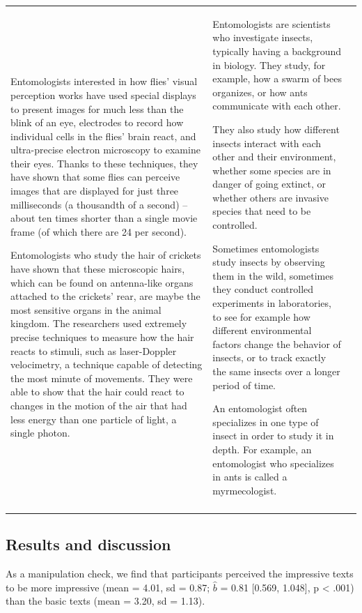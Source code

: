 \documentclass[
  english,
  doc,floatsintext]{apa6}
\begin{document}
\begin{longtable}[t]{>{\raggedright\arraybackslash}p{5em}>{\raggedright\arraybackslash}p{25em}>{\raggedright\arraybackslash}p{25em}}
Entomologists interested in how flies’ visual perception works have used special displays to present images for much less than the blink of an eye, electrodes to record how individual cells in the flies’ brain react, and ultra-precise electron microscopy to examine their eyes. Thanks to these techniques, they have shown that some flies can perceive images that are displayed for just three milliseconds (a thousandth of a second) – about ten times shorter than a single movie frame (of which there are 24 per second). 

Entomologists who study the hair of crickets have shown that these microscopic hairs, which can be found on antenna-like organs attached to the crickets’ rear, are maybe the most sensitive organs in the animal kingdom. The researchers used extremely precise techniques to measure how the hair reacts to stimuli, such as laser-Doppler velocimetry, a technique capable of detecting the most minute of movements. They were able to show that the hair could react to changes in the motion of the air that had less energy than one particle of light, a single photon. & Entomologists are scientists who investigate insects, typically having a background in biology. They study, for example, how a swarm of bees organizes, or how ants communicate with each other. 

They also study how different insects interact with each other and their environment, whether some species are in danger of going extinct, or whether others are invasive species that need to be controlled.

Sometimes entomologists study insects by observing them in the wild, sometimes they conduct controlled experiments in laboratories, to see for example how different environmental factors change the behavior of insects, or to track exactly the same insects over a longer period of time.

An entomologist often specializes in one type of insect in order to study it in depth. For example, an entomologist who specializes in ants is called a myrmecologist.\\*
\end{longtable}
\endgroup{}

\subsection{Results and discussion}\label{results-and-discussion}

As a manipulation check, we find that participants perceived the impressive texts to be more impressive (mean = 4.01, sd = 0.87; \(\hat{b}\) = 0.81 {[}0.569, 1.048{]}, p \textless{} .001) than the basic texts (mean = 3.20, sd = 1.13).
\end{document}
